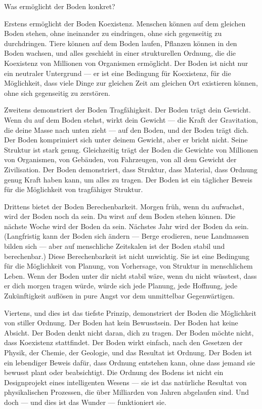 \documentclass[12pt,a4paper]{article}
\begin{document}
Was ermöglicht der Boden konkret?

Erstens ermöglicht der Boden Koexistenz. Menschen können auf dem gleichen Boden stehen, ohne ineinander zu eindringen, ohne sich gegenseitig zu durchdringen. Tiere können auf dem Boden laufen, Pflanzen können in den Boden wachsen, und alles geschieht in einer strukturellen Ordnung, die die Koexistenz von Millionen von Organismen ermöglicht. Der Boden ist nicht nur ein neutraler Untergrund — er ist eine Bedingung für Koexistenz, für die Möglichkeit, dass viele Dinge zur gleichen Zeit am gleichen Ort existieren können, ohne sich gegenseitig zu zerstören.

Zweitens demonstriert der Boden Tragfähigkeit. Der Boden trägt dein Gewicht. Wenn du auf dem Boden stehst, wirkt dein Gewicht — die Kraft der Gravitation, die deine Masse nach unten zieht — auf den Boden, und der Boden trägt dich. Der Boden komprimiert sich unter deinem Gewicht, aber er bricht nicht. Seine Struktur ist stark genug. Gleichzeitig trägt der Boden die Gewichte von Millionen von Organismen, von Gebäuden, von Fahrzeugen, von all dem Gewicht der Zivilisation. Der Boden demonstriert, dass Struktur, dass Material, dass Ordnung genug Kraft haben kann, um alles zu tragen. Der Boden ist ein täglicher Beweis für die Möglichkeit von tragfähiger Struktur.

Drittens bietet der Boden Berechenbarkeit. Morgen früh, wenn du aufwachst, wird der Boden noch da sein. Du wirst auf dem Boden stehen können. Die nächste Woche wird der Boden da sein. Nächstes Jahr wird der Boden da sein. (Langfristig kann der Boden sich ändern — Berge erodieren, neue Landmassen bilden sich — aber auf menschliche Zeitskalen ist der Boden stabil und berechenbar.) Diese Berechenbarkeit ist nicht unwichtig. Sie ist eine Bedingung für die Möglichkeit von Planung, von Vorhersage, von Struktur in menschlichem Leben. Wenn der Boden unter dir nicht stabil wäre, wenn du nicht wüsstest, dass er dich morgen tragen würde, würde sich jede Planung, jede Hoffnung, jede Zukünftigkeit auflösen in pure Angst vor dem unmittelbar Gegenwärtigen.

Viertens, und dies ist das tiefste Prinzip, demonstriert der Boden die Möglichkeit von stiller Ordnung. Der Boden hat kein Bewusstsein. Der Boden hat keine Absicht. Der Boden denkt nicht daran, dich zu tragen. Der Boden möchte nicht, dass Koexistenz stattfindet. Der Boden wirkt einfach, nach den Gesetzen der Physik, der Chemie, der Geologie, und das Resultat ist Ordnung. Der Boden ist ein lebendiger Beweis dafür, dass Ordnung entstehen kann, ohne dass jemand sie bewusst plant oder beabsichtigt. Die Ordnung des Bodens ist nicht ein Designprojekt eines intelligenten Wesens — sie ist das natürliche Resultat von physikalischen Prozessen, die über Milliarden von Jahren abgelaufen sind. Und doch — und dies ist das Wunder — funktioniert sie.
\end{document}
